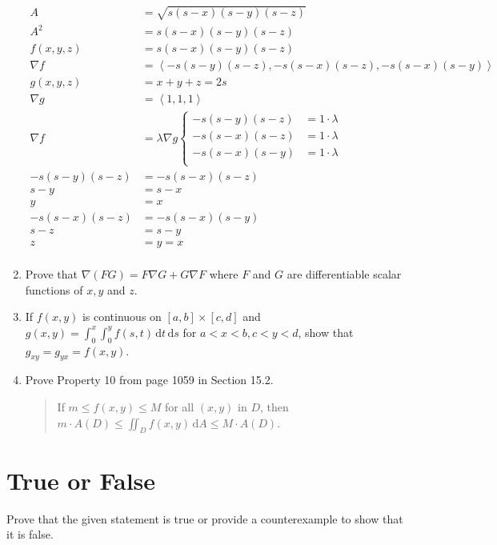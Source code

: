 \documentclass[11pt]{article}
\begin{document}
\begin{enumerate}
  \begin{align*}
    A &= \sqrt{s(s - x)(s - y)(s - z)} \\
    A^2 &= s(s - x)(s - y)(s - z) \\
    f(x, y, z) &= s(s - x)(s - y)(s - z) \\
    \nabla f &= \left< -s(s - y)(s - z), -s(s - x)(s - z), -s(s - x)(s - y) \right> \\
    g(x, y, z) &= x + y + z = 2s \\
    \nabla g &= \left< 1, 1, 1 \right> \\
    \nabla f &= \lambda\nabla g
               \begin{cases}
                 -s(s - y)(s - z) &= 1 \cdot \lambda \\
                 -s(s - x)(s - z) &= 1 \cdot \lambda \\
                 -s(s - x)(s - y) &= 1 \cdot \lambda \\
               \end{cases} \\
    -s(s - y)(s - z) &= -s(s - x)(s - z) \\
    s - y &= s - x \\
    y &= x \\
    -s(s - x)(s - z) &= -s(s - x)(s - y) \\
    s - z &= s - y \\
    z &= y = x \\
  \end{align*}

\item Prove that \( \nabla (FG) = F \nabla G + G \nabla F \) where \( F \) and
  \( G \) are differentiable scalar functions of \( x, y \) and \( z \).

\item If \(f(x,y)\) is continuous on \([a,b] \times [c,d]\) and
  \(g(x,y) = \int_0^x \int_0^y f(s,t) \, \mathrm{d}t \, \mathrm{d}s\) for
  \(a < x < b, c < y < d\), show that \(g_{xy} = g_{yx} = f(x,y)\).

\item Prove Property 10 from page 1059 in Section 15.2.
  \begin{quote}
    If \(m \leq f(x,y) \leq M\) for all \((x,y)\) in \(D\), then
    \(m \cdot A(D) \leq \iint_D f(x,y) \, \mathrm{d}A \leq M \cdot A(D)\).
  \end{quote}
\end{enumerate}

\section*{True or False}
Prove that the given statement is true or provide a counterexample to show that it is false.
\end{document}
